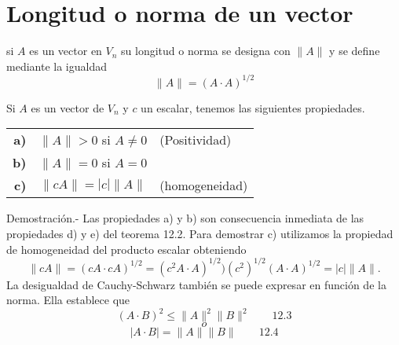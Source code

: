 \section{Longitud o norma de un vector}

\begin{tcolorbox}
    \begin{def.} si $A$ es un vector en $V_n$ su longitud o norma se designa con $\|A\|$ y se define mediante la igualdad $$\|A\| = (A\cdot A)^{1/2}$$
    \end{def.}
\end{tcolorbox}

\begin{teo} Si $A$ es un vector de $V_n$ y $c$ un escalar, tenemos las siguientes propiedades.
\begin{center}
    \begin{tabular}{rcl}
	\textbf{a)}&$\|A\|>0$ si $A\neq 0$&(Positividad)\\	
	\textbf{b)}&$\|A\|=0$ si $A=0$&\\	
	\textbf{c)}&$\|cA\|=\left|c\right|\|A\|$&(homogeneidad)\\
    \end{tabular}
\end{center}

    Demostración.-\; Las propiedades a) y b) son consecuencia inmediata de las propiedades d) y e) del teorema 12.2. Para demostrar c) utilizamos la propiedad de homogeneidad del producto escalar obteniendo $$\|cA\|=(cA\cdot cA)^{1/2} = (c^2A\cdot A)^{1/2} ) (c^2)^{1/2}(A\cdot A)^{1/2} = |c|\|A\|.$$
    La desigualdad de Cauchy-Schwarz también se puede expresar en función de la norma. Ella establece que $$(A\cdot B)^2 \leq \|A\|^2 \|B\|^2\qquad \mbox{12.3}$$ $$o$$ $$|A\cdot B| = \|A\|\|B\| \qquad \mbox{12.4}$$\\\\

\end{teo}


